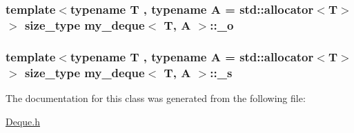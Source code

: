 \hypertarget{classmy__deque_ab2ba6a60c6e86c24a5be656bd7a9dd2b}{
\subsubsection[{\-\_\-o}]{\setlength{\rightskip}{0pt plus 5cm}template$<$typename T , typename A  = std\-::allocator$<$\-T$>$$>$ {\bf size\-\_\-type} {\bf my\-\_\-deque}$<$ T, A $>$\-::\-\_\-o\hspace{0.3cm}{\ttfamily [private]}}}\label{classmy__deque_ab2ba6a60c6e86c24a5be656bd7a9dd2b}
\hypertarget{classmy__deque_a11ca00aa25c54192740f188bdf8a3858}{
\subsubsection[{\-\_\-s}]{\setlength{\rightskip}{0pt plus 5cm}template$<$typename T , typename A  = std\-::allocator$<$\-T$>$$>$ {\bf size\-\_\-type} {\bf my\-\_\-deque}$<$ T, A $>$\-::\-\_\-s\hspace{0.3cm}{\ttfamily [private]}}}\label{classmy__deque_a11ca00aa25c54192740f188bdf8a3858}


The documentation for this class was generated from the following file\-:\begin{DoxyCompactItemize}
\item 
\hyperlink{Deque_8h}{Deque.\-h}\end{DoxyCompactItemize}
